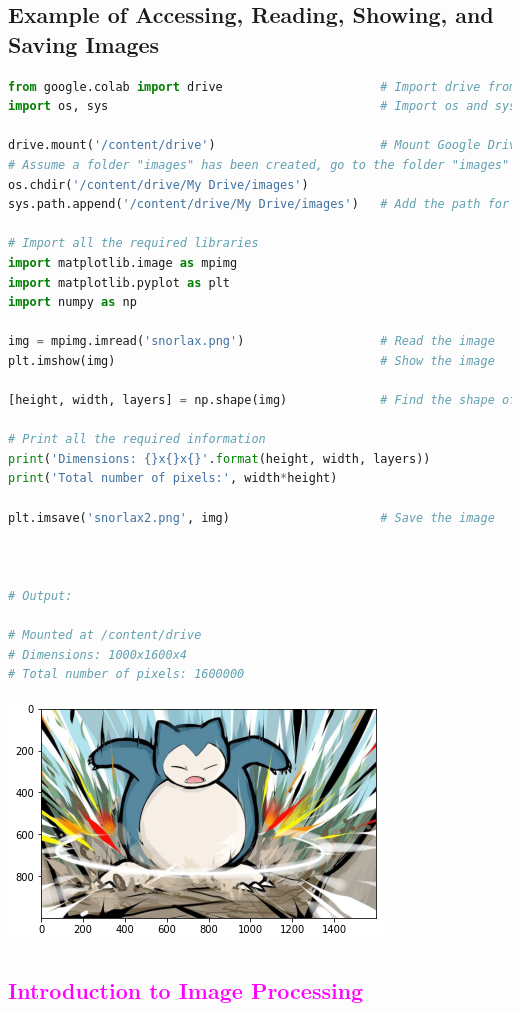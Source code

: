 \documentclass{book}
\begin{document}
\subsection{Example of Accessing, Reading, Showing, and Saving Images}
\begin{lstlisting}[language=Python, basicstyle=\ttfamily\small, keywordstyle=\color{blue}, commentstyle=\color{forestgreen}, stringstyle=\color{red}, showstringspaces=false]
from google.colab import drive                      # Import drive from google.colab package
import os, sys                                      # Import os and sys modules

drive.mount('/content/drive')                       # Mount Google Drive
# Assume a folder "images" has been created, go to the folder "images"
os.chdir('/content/drive/My Drive/images')
sys.path.append('/content/drive/My Drive/images')   # Add the path for interpreter to search

# Import all the required libraries
import matplotlib.image as mpimg
import matplotlib.pyplot as plt
import numpy as np

img = mpimg.imread('snorlax.png')                   # Read the image
plt.imshow(img)                                     # Show the image

[height, width, layers] = np.shape(img)             # Find the shape of input image

# Print all the required information
print('Dimensions: {}x{}x{}'.format(height, width, layers))
print('Total number of pixels:', width*height)

plt.imsave('snorlax2.png', img)                     # Save the image



# Output:

# Mounted at /content/drive
# Dimensions: 1000x1600x4
# Total number of pixels: 1600000
\end{lstlisting}
\begin{center}
    \includegraphics[scale=0.6]{chapter 8/snorlax.png}
\end{center}
\textcolor{magenta}{\section{\textbf{Introduction to Image Processing}}}
\end{document}
